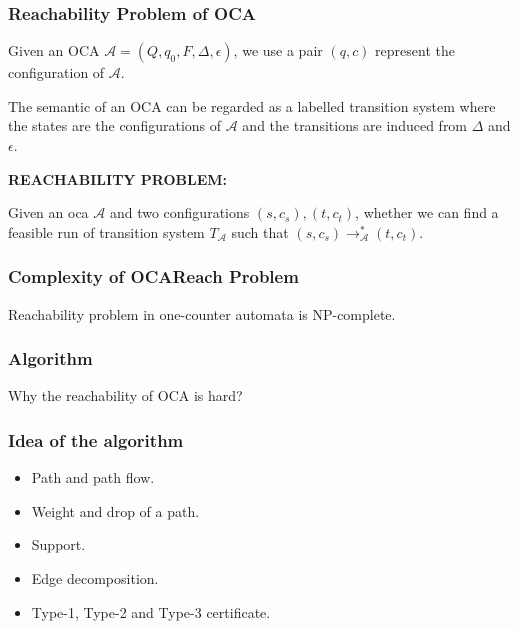 \documentclass[11pt]{beamer}
\begin{document}
\begin{frame}\frametitle{Reachability Problem of OCA}

\begin{definition}
Given an OCA $\mathcal{A} = (Q, q_0, F, \Delta, \epsilon)$, we use a pair $(q, c)$ represent the configuration of $\mathcal{A}$.

\end{definition}

The semantic of an OCA can be regarded as a labelled transition system where the states are the configurations of $\mathcal{A}$ and the transitions are induced from $\Delta$ and $\epsilon$.


\textbf{REACHABILITY PROBLEM:}

Given an oca $\mathcal{A}$ and two configurations $(s, c_s), (t, c_t)$, whether we can find a feasible run of transition system $T_{\mathcal{A}}$ such that $(s,c_s)\rightarrow_{\mathcal{A}}^*(t,c_t)$.


\end{frame}


\begin{frame}\frametitle{Complexity of OCAReach Problem}

\begin{theorem}
Reachability problem in one-counter automata is NP-complete.
\end{theorem}

\end{frame}

\begin{frame}\frametitle{Algorithm}
Why the reachability of OCA is hard?

\end{frame}

\begin{frame}\frametitle{Idea of the algorithm}
\begin{itemize}
\item Path and path flow.
\item Weight and drop of a path.
\item Support.
\item Edge decomposition.
\item Type-1, Type-2 and Type-3 certificate.
\end{itemize}

\end{frame}
\fi
\end{document}
